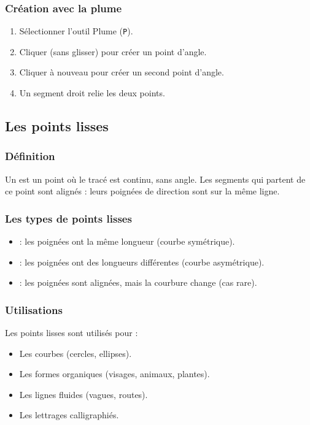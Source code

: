 \subsubsection{Création avec la plume}

\begin{enumerate}
    \item Sélectionner l'outil Plume (\texttt{P}).
    \item Cliquer (sans glisser) pour créer un point d'angle.
    \item Cliquer à nouveau pour créer un second point d'angle.
    \item Un segment droit relie les deux points.
\end{enumerate}

\subsection{Les points lisses}

\subsubsection{Définition}

Un  est un point où le tracé est continu, sans angle. Les segments qui partent de ce point sont alignés : leurs poignées de direction sont sur la même ligne.

\subsubsection{Les types de points lisses}

\begin{itemize}
    \item {} : les poignées ont la même longueur (courbe symétrique).
    \item {} : les poignées ont des longueurs différentes (courbe asymétrique).
    \item {} : les poignées sont alignées, mais la courbure change (cas rare).
\end{itemize}

\subsubsection{Utilisations}

Les points lisses sont utilisés pour :

\begin{itemize}
    \item Les courbes (cercles, ellipses).
    \item Les formes organiques (visages, animaux, plantes).
    \item Les lignes fluides (vagues, routes).
    \item Les lettrages calligraphiés.
\end{itemize}

